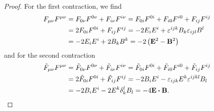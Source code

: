 \mwfieldstrengthcontracted
\begin{proof}
	For the first contraction, we find
	\begin{equation*}
		\begin{split}
			F_{\mu\nu}
			F^{\mu\nu}
			&=
			F_{0\nu}
			F^{0\nu}
			+
			F_{i\nu}
			F^{i\nu}
			=
			F_{0i}
			F^{0i}
			+
			F_{i0}
			F^{i0}
			+
			F_{ij}
			F^{ij}
			\\
			&=
			2
			F_{0i}
			F^{0i}
			+
			F_{ij}
			F^{ij}
			=
			-2
			E_i
			E^i
			+
			\varepsilon^{ijk}B_k
			\varepsilon_{ijl}B^l
			\\
			&=
			-
			2
			E_i
			E^i
			+
			2
			B_k
			B^k
			=
			-
			2
			\left(
				\vb{E}^2
				-
				\vb{B}^2
			\right)
		\end{split}
	\end{equation*}
	and for the second contraction
	\begin{equation*}
		\begin{split}
			\tilde{F}_{\mu\nu}
			F^{\mu\nu}
			&=
			\tilde{F}_{0\nu}
			F^{0\nu}
			+
			\tilde{F}_{i\nu}
			F^{i\nu}
			=
			\tilde{F}_{0i}
			F^{0i}
			+
			\tilde{F}_{i0}
			F^{i0}
			+
			\tilde{F}_{ij}
			F^{ij}
			\\
			&=
			2
			\tilde{F}_{0i}
			F^{0i}
			+
			\tilde{F}_{ij}
			F^{ij}
			=
			-
			2B_iE^i
			-
			\varepsilon_{ijk}E^k
			\varepsilon^{ijkl}B_l
			\\
			&=
			-
			2B_iE^i
			-
			2
			E^k
			\delta_k^l
			B_l
			=
			-
			4
			\vb{E}\vdot\vb{B}
			.
		\end{split}
	\end{equation*}
\end{proof}

